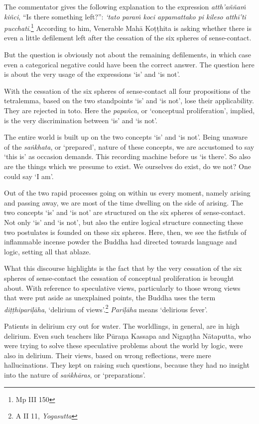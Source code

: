 The commentator gives the following explanation to the expression \emph{atth'aññaṁ kiñci}, ``Is there something left?'': \emph{`tato paraṁ koci appamattako pi kileso atthī'ti pucchati}.\footnote{Mp III 150} According to him, Venerable Mahā Koṭṭhita is asking whether there is even a little defilement left after the cessation of the six spheres of sense-contact.

But the question is obviously not about the remaining defilements, in which case even a categorical negative could have been the correct answer. The question here is about the very usage of the expressions `is' and `is not'.

With the cessation of the six spheres of sense-contact all four propositions of the tetralemma, based on the two standpoints `is' and `is not', lose their applicability. They are rejected in toto. Here the \emph{papañca}, or `conceptual proliferation', implied, is the very discrimination between `is' and `is not'.

The entire world is built up on the two concepts `is' and `is not'. Being unaware of the \emph{saṅkhata}, or `prepared', nature of these concepts, we are accustomed to say `this is' as occasion demands. This recording machine before us `is there'. So also are the things which we presume to exist. We ourselves do exist, do we not? One could say `I am'.

Out of the two rapid processes going on within us every moment, namely arising and passing away, we are most of the time dwelling on the side of arising. The two concepts `is' and `is not' are structured on the six spheres of sense-contact. Not only `is' and `is not', but also the entire logical structure connecting these two postulates is founded on these six spheres. Here, then, we see the fistfuls of inflammable incense powder the Buddha had directed towards language and logic, setting all that ablaze.

What this discourse highlights is the fact that by the very cessation of the six spheres of sense-contact the cessation of conceptual proliferation is brought about. With reference to speculative views, particularly to those wrong views that were put aside as unexplained points, the Buddha uses the term \emph{diṭṭhipariḷāha}, `delirium of views'.\footnote{A II 11, \emph{Yogasutta}} \emph{Pariḷāha} means `delirious fever'.

\enlargethispage{\baselineskip}

Patients in delirium cry out for water. The worldlings, in general, are in high delirium. Even such teachers like Pūraṇa Kassapa and Nigaṇṭha Nātaputta, who were trying to solve these speculative problems about the world by logic, were also in delirium. Their views, based on wrong reflections, were mere hallucinations. They kept on raising such questions, because they had no insight into the nature of \emph{saṅkhāras}, or `preparations'.


